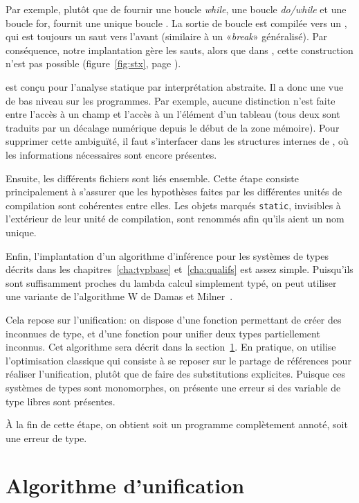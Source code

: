 Par exemple, plutôt que de fournir une boucle \emph{while}, une boucle
\emph{do/while} et une boucle for, \newspeak fournit une unique boucle
\npkWhile{}. La sortie de boucle est compilée vers un \npkGoto{}\cite{goto}, qui
est toujours un saut vers l'avant (similaire à un «\emph{break}» généralisé).
Par conséquence, notre implantation gère les sauts, alors que dans \langname,
cette construction n'est pas possible (figure~\ref{fig:stx}, page
\pageref{fig:stx}).

\newspeak est conçu pour l'analyse statique par interprétation abstraite. Il a
donc une vue de bas niveau sur les programmes. Par exemple, aucune distinction
n'est faite entre l'accès à un champ et l'accès à un l'élément d'un tableau
(tous deux sont traduits par un décalage numérique depuis le début de la zone
mémoire). Pour supprimer cette ambiguïté, il faut s'interfacer dans les
structures internes de \ctonewspeak, où les informations nécessaires sont
encore présentes.

Ensuite, les différents fichiers sont liés ensemble. Cette étape consiste
principalement à s'assurer que les hypothèses faites par les différentes unités
de compilation sont cohérentes entre elles. Les objets marqués \texttt{static},
invisibles à l'extérieur de leur unité de compilation, sont renommés afin qu'ils
aient un nom unique.

Enfin, l'implantation d'un algorithme d'inférence pour les systèmes de types
décrits dans les chapitres~\ref{cha:typbase} et~\ref{cha:qualifs} est assez
simple. Puisqu'ils sont suffisamment proches du lambda calcul simplement typé, on
peut utiliser une variante de l'algorithme W de Damas et
Milner~\cite{DamasMilner}.

Cela repose sur l'unification: on dispose d'une fonction permettant de créer des
inconnues de type, et d'une fonction pour unifier deux types partiellement
inconnus. Cet algorithme sera décrit dans la section~\ref{sec:unif}. En
pratique, on utilise l'optimisation classique qui consiste à se
reposer sur le partage de références pour réaliser l'unification, plutôt que de
faire des substitutions explicites. Puisque ces systèmes de types sont
monomorphes, on présente une erreur si des variable de type libres sont
présentes.

À la fin de cette étape, on obtient soit un programme complètement annoté, soit
une erreur de type.

\section{Algorithme d'unification}
\label{sec:unif}

